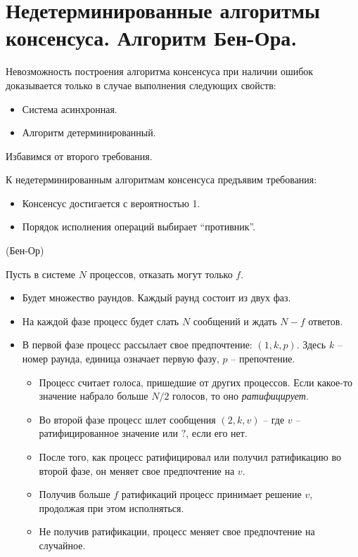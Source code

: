 \section{Недетерминированные алгоритмы консенсуса. Алгоритм Бен-Ора.}

\begin{remark}
    Невозможность построения алгоритма консенсуса при наличии ошибок доказывается
    только в случае выполнения следующих свойств:
    \begin{itemize}
        \item Система асинхронная.
        \item Алгоритм детерминированный.
    \end{itemize}
    Избавимся от второго требования.
\end{remark}

\begin{remark}
    К недетерминированным алгоритмам консенсуса предъявим требования:
    \begin{itemize}
        \item Консенсус достигается с вероятностью 1.
        \item Порядок исполнения операций выбирает ``противник''.
    \end{itemize}
\end{remark}

\begin{algorithm}(Бен-Ор)
    
    Пусть в системе $N$ процессов, отказать могут только $f$.
    \begin{itemize}
        \item Будет множество раундов. Каждый раунд состоит из двух фаз.
        \item На каждой фазе процесс будет слать $N$ сообщений и ждать
            $N - f$ ответов.
        \item В первой фазе процесс рассылает свое предпочтение:
            $(1, k, p)$. Здесь $k$ -- номер раунда, единица означает
            первую фазу, $p$ -- препочтение.
            \begin{itemize}
                \item Процесс считает голоса, пришедшие от других процессов.
                    Если какое-то значение набрало больше $N/2$ голосов,
                    то оно \textit{ратифицирует}.
                \item Во второй фазе процесс шлет сообщения $(2, k, v)$ --
                    где $v$ -- ратифицированное значение или $?$, если
                    его нет.
                \item После того, как процесс ратифицировал или получил
                    ратификацию во второй фазе, он меняет свое предпочтение на $v$.
                \item Получив больше $f$ ратификаций процесс принимает решение $v$,
                    продолжая при этом исполняться.
                \item Не получив ратификации, процесс меняет свое предпочтение
                    на случайное.
            \end{itemize}
    \end{itemize}
\end{algorithm}

